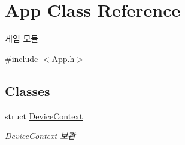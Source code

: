 \hypertarget{class_app}{}\section{App Class Reference}
\label{class_app}


게임 모듈  




{\ttfamily \#include $<$App.\+h$>$}

\subsection*{Classes}
\begin{DoxyCompactItemize}
\item 
struct \mbox{\hyperlink{struct_app_1_1_device_context}{Device\+Context}}
\begin{DoxyCompactList}\small\item\em \mbox{\hyperlink{struct_app_1_1_device_context}{Device\+Context}} 보관 \end{DoxyCompactList}\end{DoxyCompactItemize}
